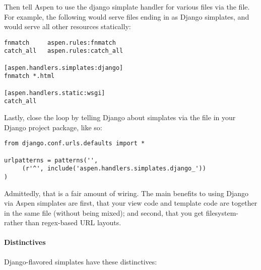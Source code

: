 Then tell Aspen to use the django simplate handler for various files via the
 file. For example, the following
 would serve files ending in  as Django
simplates, and would serve all other resources statically:

\begin{verbatim}
fnmatch     aspen.rules:fnmatch
catch_all   aspen.rules:catch_all

[aspen.handlers.simplates:django]
fnmatch *.html

[aspen.handlers.static:wsgi]
catch_all
\end{verbatim}

Lastly, close the loop by telling Django about simplates via the 
file in your Django project package, like so:

\begin{verbatim}
from django.conf.urls.defaults import *

urlpatterns = patterns('',
     (r'^', include('aspen.handlers.simplates.django_'))
)
\end{verbatim}

Admittedly, that is a fair amount of wiring. The main benefits to using Django
via Aspen simplates are first, that your view code and template code are
together in the same file (without being mixed); and second, that you get
filesystem- rather than regex-based URL layouts.


\paragraph{Distinctives}

Django-flavored simplates have these distinctives:

